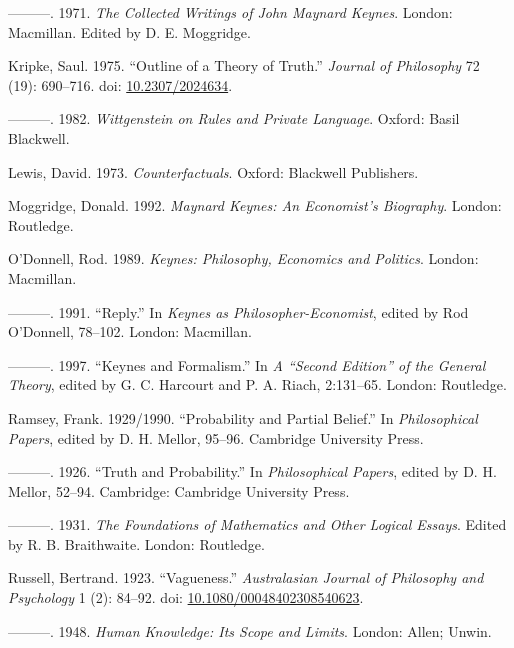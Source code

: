 \documentclass[
  11pt,
  letterpaper,
  DIV=11,
  numbers=noendperiod,
  twoside]{scrartcl}
\newlength{\cslhangindent}
\newenvironment{CSLReferences}[2] %
 {\begin{list}{}{%
  \setlength{\itemindent}{0pt}
  \setlength{\leftmargin}{0pt}
  \setlength{\parsep}{0pt}
  \ifodd #1
   \setlength{\leftmargin}{\cslhangindent}
   \setlength{\itemindent}{-1\cslhangindent}
  \fi
  \setlength{\itemsep}{#2\baselineskip}}}
 {\end{list}}
\begin{document}
\begin{CSLReferences}{1}{0}
---------. 1971. \emph{The Collected Writings of John Maynard Keynes}.
London: Macmillan. Edited by D. E. Moggridge.

Kripke, Saul. 1975. {``Outline of a Theory of Truth.''} \emph{Journal of
Philosophy} 72 (19): 690--716. doi:
\href{https://doi.org/10.2307/2024634}{10.2307/2024634}.

---------. 1982. \emph{Wittgenstein on Rules and Private Language}.
Oxford: Basil Blackwell.

Lewis, David. 1973. \emph{Counterfactuals}. Oxford: Blackwell
Publishers.

Moggridge, Donald. 1992. \emph{Maynard Keynes: An Economist's
Biography}. London: Routledge.

O'Donnell, Rod. 1989. \emph{Keynes: Philosophy, Economics and Politics}.
London: Macmillan.

---------. 1991. {``Reply.''} In \emph{Keynes as Philosopher-Economist},
edited by Rod O'Donnell, 78--102. London: Macmillan.

---------. 1997. {``Keynes and Formalism.''} In \emph{A {``Second
Edition''} of the General Theory}, edited by G. C. Harcourt and P. A.
Riach, 2:131--65. London: Routledge.

Ramsey, Frank. 1929/1990. {``Probability and Partial Belief.''} In
\emph{Philosophical Papers}, edited by D. H. Mellor, 95--96. Cambridge
University Press.

---------. 1926. {``Truth and Probability.''} In \emph{Philosophical
Papers}, edited by D. H. Mellor, 52--94. Cambridge: Cambridge University
Press.

---------. 1931. \emph{The Foundations of Mathematics and Other Logical
Essays}. Edited by R. B. Braithwaite. London: Routledge.

Russell, Bertrand. 1923. {``Vagueness.''} \emph{Australasian Journal of
Philosophy and Psychology} 1 (2): 84--92. doi:
\href{https://doi.org/10.1080/00048402308540623}{10.1080/00048402308540623}.

---------. 1948. \emph{Human Knowledge: Its Scope and Limits}. London:
Allen; Unwin.


\end{CSLReferences}
\end{document}
